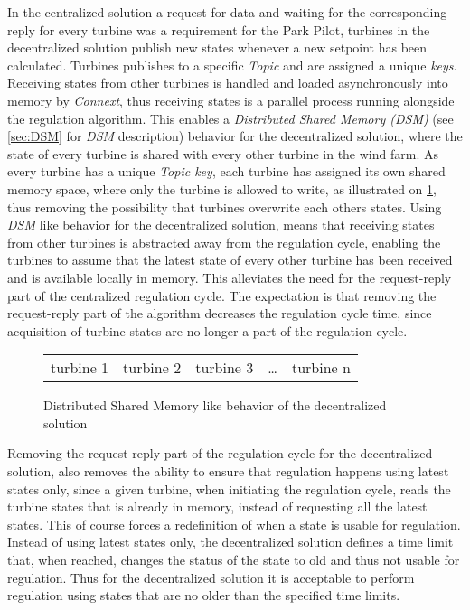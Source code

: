 In the centralized solution a request for data and waiting for the corresponding reply for every turbine was a requirement for the Park Pilot, turbines in the decentralized solution publish new states whenever a new setpoint has been calculated. Turbines publishes to a specific \textit{Topic} and are assigned a unique \textit{keys}. Receiving states from other turbines is handled and loaded asynchronously into memory by \textit{Connext}, thus receiving states is a parallel process running alongside the regulation algorithm.
This enables a \textit{Distributed Shared Memory (DSM)} (see \cref{sec:DSM} for \textit{DSM} description) behavior for the decentralized solution, where the state of every turbine is shared with every other turbine in the wind farm.
As every turbine has a unique \textit{Topic key}, each turbine has assigned its own shared memory space, where only the turbine is allowed to write, as illustrated on \cref{fig:DSMlikeBehavior}, thus removing the possibility that turbines overwrite each others states. Using \textit{DSM} like behavior for the decentralized solution, means that receiving states from other turbines is abstracted away from the regulation cycle, enabling the turbines to assume that the latest state of every other turbine has been received and is available locally in memory. This alleviates the need for the request-reply part of the centralized regulation cycle. The expectation is that removing the request-reply part of the algorithm decreases the regulation cycle time, since acquisition of turbine states are no longer a part of the regulation cycle.  

\begin{figure}[!h]
	\begin{tabular}{ | c | c | c | c | c |}
		\cline{1-3}
		\cline{5-5}
		turbine 1 & turbine 2 & turbine 3 & \dots & turbine n \\
		\cline{1-3}
		\cline{5-5}
	\end{tabular}
	\caption{Distributed Shared Memory like behavior of the decentralized solution}
	\label{fig:DSMlikeBehavior}
\end{figure}

Removing the request-reply part of the regulation cycle for the decentralized solution, also removes the ability to ensure that regulation happens using latest states only, since a given turbine, when initiating the regulation cycle, reads the turbine states that is already in memory, instead of requesting all the latest states. This of course forces a redefinition of when a state is usable for regulation. Instead of using latest states only, the decentralized solution defines a time limit that, when reached, changes the status of the state to old and thus not usable for regulation. Thus for the decentralized solution it is acceptable to perform regulation using states that are no older than the specified time limits. 

